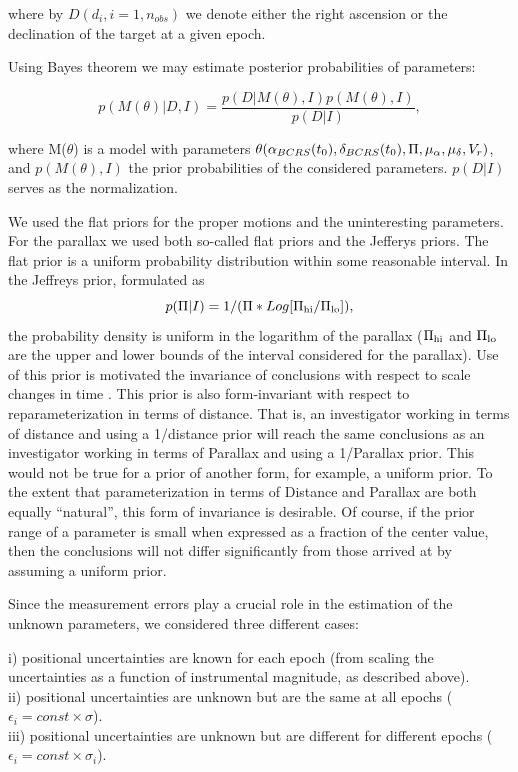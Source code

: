 \documentclass[12pt,preprint]{aastex}
\begin{document}
\noindent where by $D(d_i, i=1,n_{obs})$ we denote either the right ascension or
the declination of the target at a given epoch.

Using Bayes theorem we may estimate posterior probabilities of parameters:

\begin{equation} 
\label{eqs4}
   p(M(\theta)|D,I)=\frac{p(D|M(\theta),I)p(M(\theta),I)}{p(D|I)},
\end{equation}

\noindent where M($\theta$) is a model with parameters 
${\boldmath \theta}(\alpha_{BCRS}(t_0),\delta_{BCRS}(t_0),\Pi,\mu_{\alpha},\mu_{\delta},V_r)$, 
and $p(M(\theta),I)$ the prior probabilities of the considered parameters.
$p(D|I)$ serves as the normalization.

We used the flat priors for the proper motions and the uninteresting parameters.
For the parallax we used both so-called flat priors and the Jefferys priors.
The flat prior is a uniform probability distribution within some reasonable
interval.
In the Jeffreys prior, formulated as
\begin{equation} 
\label{eqs5}
p(\Pi|I) = 1/(\Pi*Log[\Pi_{\rm hi}/\Pi_{\rm lo}]) ,
\end{equation}
the probability density is uniform in the logarithm of the
parallax ($\Pi_{\rm hi}$ and $\Pi_{\rm lo}$ are the upper and lower bounds of
the interval considered for the parallax).
Use of this prior is motivated the invariance 
of conclusions with respect to scale changes in time
\citep{J98}.
This prior is also form-invariant with respect to
reparameterization in terms of distance. That is,
an investigator working in terms of distance and using a 1/distance prior
will reach the same conclusions as an investigator working in terms of
Parallax and using a 1/Parallax prior.
This would not be true for a prior of another form, for example, a uniform
prior.
To the extent that parameterization in terms of Distance and Parallax are
both equally ``natural'', this form of invariance is desirable.
Of course, if the prior range of a parameter is small when expressed as a
fraction of the center value, then the conclusions will not differ
significantly from those arrived at by assuming a uniform prior.

Since the measurement errors play a crucial role in the estimation 
of the unknown parameters, we considered three different cases: 

\noindent i) positional uncertainties are known for each epoch (from scaling the
uncertainties as a function of instrumental magnitude, as described above).\\
ii) positional uncertainties are unknown but are the same at all
epochs ($\epsilon_i=const\times\sigma$). \\ 
iii) positional uncertainties are unknown but are different for
different epochs ($\epsilon_i=const\times\sigma_i$).
\end{document}
